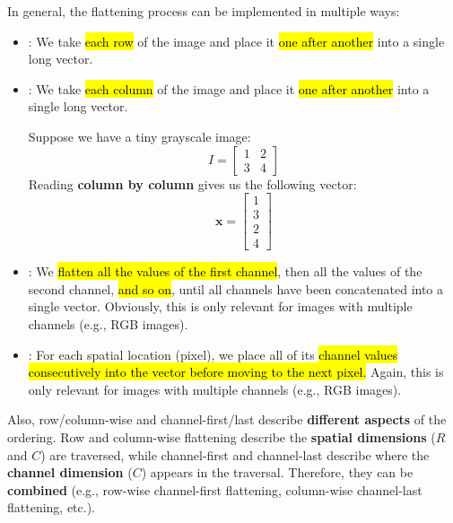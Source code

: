 \highspace
In general, the flattening process can be implemented in multiple ways:
\begin{itemize}
    \item {}: We take \hl{each row} of the image and place it \hl{one after another} into a single long vector.
    
    \item {}: We take \hl{each column} of the image and place it \hl{one after another} into a single long vector.

    \begin{examplebox}
        Suppose we have a tiny grayscale image:
        \begin{equation*}
            I = \begin{bmatrix}
                1 & 2 \\
                3 & 4
            \end{bmatrix}
        \end{equation*}
        Reading \textbf{column by column} gives us the following vector:
        \begin{equation*}
            \mathbf{x} = \begin{bmatrix}
                1 \\
                3 \\
                2 \\
                4
            \end{bmatrix}
        \end{equation*}
    \end{examplebox}
    
    \item {}: We \hl{flatten all the values of the first channel}, then all the values of the second channel, \hl{and so on}, until all channels have been concatenated into a single vector. Obviously, this is only relevant for images with multiple channels (e.g., RGB images).
    
    \item {}: For each spatial location (pixel), we place all of its \hl{channel values consecutively into the vector before moving to the next pixel.} Again, this is only relevant for images with multiple channels (e.g., RGB images).
\end{itemize}
Also, row/column-wise and channel-first/last describe \textbf{different aspects} of the ordering. Row and column-wise flattening describe the \textbf{spatial dimensions} ($R$ and $C$) are traversed, while channel-first and channel-last describe where the \textbf{channel dimension} ($C$) appears in the traversal. Therefore, they can be \textbf{combined} (e.g., row-wise channel-first flattening, column-wise channel-last flattening, etc.).

